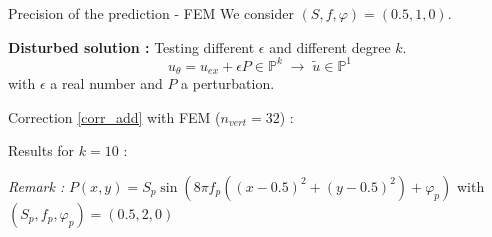 \begin{frame}{Precision of the prediction - FEM}  
    We consider $(S,f,\varphi)=(0.5,1,0)$.

    \textbf{Disturbed solution :} Testing different $\epsilon$ and different degree $k$.
    $$u_\theta=u_{ex}+\epsilon P\in\mathbb{P}^{k} \; \rightarrow \; \tilde{u}\in\mathbb{P}^1$$
    with $\epsilon$ a real number and $P$ a perturbation.
    
    \begin{minipage}{0.58\linewidth}        
        Correction \eqref{corr_add} with FEM ($n_{vert}=32$) :

        \centering
    \end{minipage} \hfill
    \begin{minipage}{0.38\linewidth}        
        \vspace{-5pt}
        Results for $k=10$ :

        \centering
    \end{minipage}

    \footnotesize
    \textit{Remark :} $P(x,y)=S_p\sin\left(8\pi f_p\left((x-0.5)^2+(y-0.5)^2\right)+\varphi_p\right)$ with $(S_p,f_p,\varphi_p)=(0.5,2,0)$
\end{frame}

